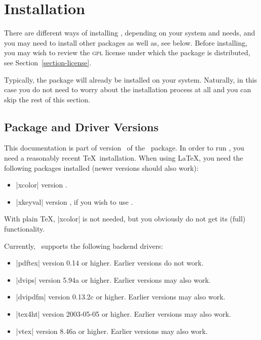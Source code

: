 %


\section{Installation}

There are different ways of installing \pgfname, depending
on your system and needs, and you may need to install other
packages as well as, see below. Before installing, you may wish to
review the \textsc{gpl} license under which the package is
distributed, see Section~\ref{section-license}. 

Typically, the package will already be installed on your
system. Naturally, in this case you do not need to worry about the
installation process at all and you can skip the rest of this
section. 


\subsection{Package and Driver Versions}

This documentation is part of version \pgfversion\ of the \pgfname\
package. In order to run \pgfname, you need a reasonably recent 
\TeX\ installation. When using \LaTeX, you need the following packages
installed (newer versions should also work):
\begin{itemize}
\item
  |xcolor| version \xcolorversion.
\item
  |xkeyval| version \xkeyvalversion, if you wish to use \tikzname.
\end{itemize}
With plain \TeX, |xcolor| is not needed, but you obviously do not
get its (full) functionality. 

Currently, \pgfname\ supports the following backend drivers:
\begin{itemize}
\item
  |pdftex| version 0.14 or higher. Earlier versions do not work.
\item
  |dvips| version 5.94a or higher. Earlier versions may also work.
\item
  |dvipdfm| version 0.13.2c or higher. Earlier versions may also work.
\item
  |tex4ht| version 2003-05-05 or higher. Earlier versions may also work.
\item
  |vtex| version 8.46a or higher. Earlier versions may also work.
\end{itemize}

